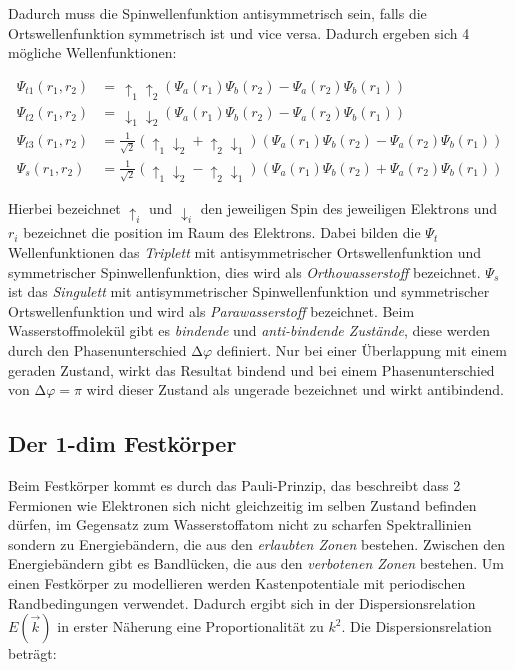 Dadurch muss die Spinwellenfunktion antisymmetrisch sein, falls die Ortswellenfunktion symmetrisch ist und vice versa. Dadurch ergeben sich 4 mögliche Wellenfunktionen:

\begin{align}
    \Psi_{t1} (r_1, r_2) &= \, \uparrow_1 \uparrow_2 \left( \Psi_a (r_1) \Psi_b (r_2) - \Psi_a (r_2) \Psi_b (r_1) \right) \\
    \Psi_{t2} (r_1, r_2) &= \, \downarrow_1 \downarrow_2 \left( \Psi_a (r_1) \Psi_b (r_2) - \Psi_a (r_2) \Psi_b (r_1) \right) \\
    \Psi_{t3} (r_1, r_2) &= \frac{1}{\sqrt{2}} \left( \uparrow_1 \downarrow_2 + \uparrow_2 \downarrow_1 \right) \left( \Psi_a (r_1) \Psi_b (r_2) - \Psi_a (r_2) \Psi_b (r_1) \right) \\
    \Psi_{s} (r_1, r_2) &= \frac{1}{\sqrt{2}} \left( \uparrow_1 \downarrow_2 - \uparrow_2 \downarrow_1 \right) \left( \Psi_a (r_1) \Psi_b (r_2) + \Psi_a (r_2) \Psi_b (r_1) \right)
\end{align}

Hierbei bezeichnet $\uparrow_i$ und $\downarrow_i$ den jeweiligen Spin des jeweiligen Elektrons und $r_i$ bezeichnet die position im Raum des Elektrons. Dabei bilden die $\Psi_t$ Wellenfunktionen das \textit{Triplett} mit antisymmetrischer Ortswellenfunktion und symmetrischer Spinwellenfunktion, dies wird als \textit{Orthowasserstoff} bezeichnet. $\Psi_s$ ist das \textit{Singulett} mit antisymmetrischer Spinwellenfunktion und symmetrischer Ortswellenfunktion und wird als \textit{Parawasserstoff} bezeichnet. Beim Wasserstoffmolekül gibt es \textit{bindende} und \textit{anti-bindende Zustände}, diese werden durch den Phasenunterschied $\increment \varphi$ definiert. Nur bei einer Überlappung mit einem geraden Zustand, wirkt das Resultat bindend und bei einem Phasenunterschied von $\increment \varphi = \pi$ wird dieser Zustand als ungerade bezeichnet und wirkt antibindend.

\subsection{Der 1-dim Festkörper}
\label{sec:festkoerper}

Beim Festkörper kommt es durch das Pauli-Prinzip, das beschreibt dass 2 Fermionen wie Elektronen sich nicht gleichzeitig im selben Zustand befinden dürfen, im Gegensatz zum Wasserstoffatom nicht zu scharfen Spektrallinien sondern zu Energiebändern, die aus den \textit{erlaubten Zonen} bestehen. Zwischen den Energiebändern gibt es Bandlücken, die aus den \textit{verbotenen Zonen} bestehen. Um einen Festkörper zu modellieren werden Kastenpotentiale mit periodischen Randbedingungen verwendet. Dadurch ergibt sich in der Dispersionsrelation $E(\vec{k})$ in erster Näherung eine Proportionalität zu $k^2$. Die Dispersionsrelation beträgt:

